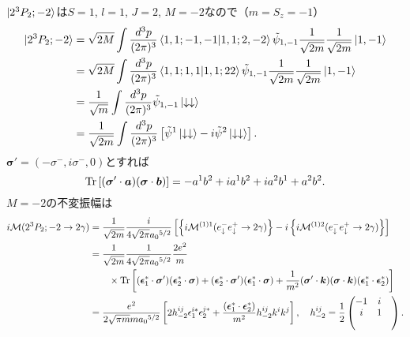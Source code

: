 $\ket{2^3P_2;-2}$は$S=1$, $l=1$, $J=2$, $M=-2$なので（$m=S_z=-1$）
\begin{align*}
  \ket{2^3P_2;-2} &= \sqrt{2M} \int \frac{d^3p}{(2\pi)^3}
  \braket{1,1; -1,-1 | 1,1; 2, -2} \tilde{\psi}_{1,-1} \frac{1}{\sqrt{2m}}\frac{1}{\sqrt{2m}} \ket{1, -1} \\
  &= \sqrt{2M} \int \frac{d^3p}{(2\pi)^3}
  \braket{1,1; 1,1 | 1,1; 22} \tilde{\psi}_{1,-1} \frac{1}{\sqrt{2m}}\frac{1}{\sqrt{2m}} \ket{1, -1} \\
  &= \frac{1}{\sqrt{m}} \int \frac{d^3p}{(2\pi)^3} \tilde{\psi}_{1,-1} \ket{\downarrow\downarrow} \\
  &= \frac{1}{\sqrt{2m}} \int \frac{d^3p}{(2\pi)^3} \left[ \tilde\psi^1 \ket{\downarrow\downarrow} - i \tilde\psi^2 \ket{\downarrow\downarrow} \right] .
\end{align*}
$\boldsymbol\sigma' = (- \sigma^-, i\sigma^-, 0)$とすれば
\[ \operatorname{Tr} \left[ (\boldsymbol\sigma' \cdot \boldsymbol{a}) (\boldsymbol\sigma \cdot \boldsymbol{b}) \right] = - a^1b^2 + i a^1b^2 + i a^2b^1 + a^2b^2 . \]
$M=-2$の不変振幅は
\begin{align*}
  i\mathcal{M}(2^3P_2;-2 \to 2\gamma) &= \frac{1}{\sqrt{2m}} \frac{i}{4\sqrt{2\pi} a_0{}^{5/2}}
  \left[ \left\{ i\mathcal{M}^{(1)1}(e^-_\downarrow e^+_\downarrow \to 2\gamma) \right\}
  - i \left\{ i\mathcal{M}^{(1)2}(e^-_\downarrow e^+_\downarrow \to 2\gamma) \right\} \right] \\
  &= \frac{1}{\sqrt{2m}} \frac{1}{4\sqrt{2\pi} a_0{}^{5/2}} \frac{2e^2}{m} \\
  & \qquad \times \operatorname{Tr} \left[ (\boldsymbol{\epsilon}_1^\ast \cdot \boldsymbol\sigma') (\boldsymbol{\epsilon}_2^\ast \cdot \boldsymbol\sigma)
  + (\boldsymbol{\epsilon}_2^\ast \cdot \boldsymbol\sigma')(\boldsymbol{\epsilon}_1^\ast \cdot \boldsymbol\sigma)
  + \frac{1}{m^2} (\boldsymbol\sigma' \cdot \boldsymbol{k})(\boldsymbol\sigma \cdot \boldsymbol{k})(\boldsymbol{\epsilon}_1^\ast \cdot \boldsymbol{\epsilon}_2^\ast) \right] \\
  &= \frac{e^2}{2\sqrt{\pi m}m a_0{}^{5/2}} \left[ 2h_{-2}^{ij} \epsilon_1^{i\ast} \epsilon_2^{j\ast}
  + \frac{(\boldsymbol{\epsilon}_1^\ast \cdot \boldsymbol{\epsilon}_2^\ast)}{m^2} h_{-2}^{ij} k^ik^j \right] , \quad
  h_{-2}^{ij} = \frac{1}{2}
  \begin{pmatrix}
    -1 & i & \\
    i & 1 & \\
    & &
  \end{pmatrix}
  .
\end{align*}

